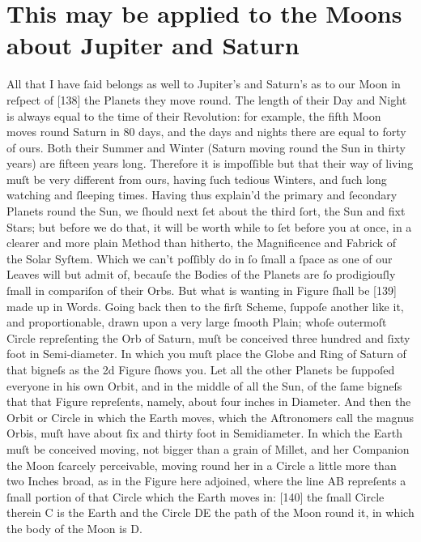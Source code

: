 \documentclass[letterpaper]{book}
\begin{document}
\section{This may be applied to the Moons about Jupiter and Saturn}

All that I have ſaid belongs as well to Jupiter's and Saturn's as to our Moon
in reſpect of [138] the Planets they move round. The length of their Day and
Night is always equal to the time of their Revolution: for example, the fifth
Moon moves round Saturn in 80 days, and the days and nights there are equal to
forty of ours. Both their Summer and Winter (Saturn moving round the Sun in
thirty years) are fifteen years long. Therefore it is impoſſible but that their
way of living muſt be very different from ours, having ſuch tedious Winters,
and ſuch long watching and ſleeping times.  Having thus explain'd the primary
and ſecondary Planets round the Sun, we ſhould next ſet about the third ſort,
the Sun and fixt Stars; but before we do that, it will be worth while to ſet
before you at once, in a clearer and more plain Method than hitherto, the
Magnificence and Fabrick of the Solar Syſtem. Which we can't poſſibly do in ſo
ſmall a ſpace as one of our Leaves will but admit of, becauſe the Bodies of the
Planets are ſo prodigiouſly ſmall in compariſon of their Orbs. But what is
wanting in Figure ſhall be [139] made up in Words. Going back then to the firſt
Scheme, ſuppoſe another like it, and proportionable, drawn upon a very large
ſmooth Plain; whoſe outermoſt Circle repreſenting the Orb of Saturn, muſt be
conceived three hundred and ſixty foot in Semi-diameter. In which you muſt
place the Globe and Ring of Saturn of that bigneſs as the 2d Figure ſhows you.
Let all the other Planets be ſuppoſed everyone in his own Orbit, and in the
middle of all the Sun, of the ſame bigneſs that that Figure repreſents, namely,
about four inches in Diameter. And then the Orbit or Circle in which the Earth
moves, which the Aſtronomers call the magnus Orbis, muſt have about ſix and
thirty foot in Semidiameter. In which the Earth muſt be conceived moving, not
bigger than a grain of Millet, and her Companion the Moon ſcarcely perceivable,
moving round her in a Circle a little more than two Inches broad, as in the
Figure here adjoined, where the line AB repreſents a ſmall portion of that
Circle which the Earth moves in: [140] the ſmall Circle therein C is the Earth
and the Circle DE the path of the Moon round it, in which the body of the Moon
is D.  
\end{document}
